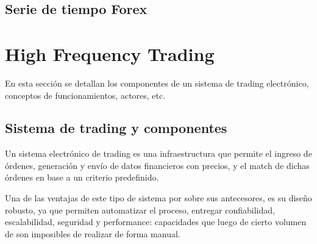 
\subsection{Serie de tiempo Forex}

\section{High Frequency Trading}

En esta sección se detallan los componentes de un sistema de trading
electrónico, conceptos de funcionamientos, actores, etc.

\subsection{Sistema de trading y componentes}
Un sistema electrónico de trading es una infraestructura que permite el ingreso
de órdenes, generación y envío de datos financieros con precios, y el match de
dichas órdenes en base a un criterio predefinido.

Una de las ventajas de este tipo de sistema por sobre sus antecesores, es su
diseño robusto, ya que permiten automatizar el proceso, entregar confiabilidad,
escalabilidad, seguridad y performance: capacidades que luego de cierto volumen
de son imposibles de realizar de forma manual.

